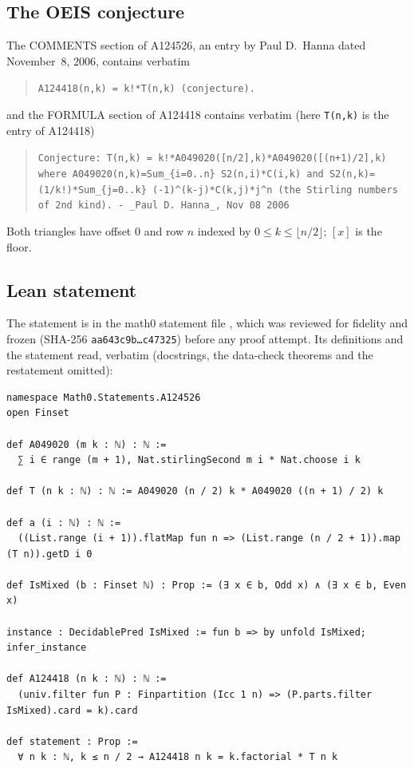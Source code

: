\documentclass[11pt]{amsart}
\theoremstyle{plain}
\theoremstyle{definition}
\begin{document}
\subsection*{The OEIS conjecture}
The COMMENTS section of A124526, an entry by Paul D.~Hanna dated November~8, 2006, contains verbatim
\begin{quote}
\small\texttt{A124418(n,k) = k!*T(n,k) (conjecture).}
\end{quote}
and the FORMULA section of A124418 contains verbatim (here \texttt{T(n,k)} is the entry of A124418)
\begin{quote}
\raggedright\small\texttt{Conjecture: T(n,k) = k!*A049020([n/2],k)*A049020([(n+1)/2],k) where A049020(n,k)=Sum\_\{i=0..n\} S2(n,i)*C(i,k) and S2(n,k)=(1/k!)*Sum\_\{j=0..k\} (-1)\^{}(k-j)*C(k,j)*j\^{}n (the Stirling numbers of 2nd kind). - \_Paul D.\ Hanna\_, Nov 08 2006}
\end{quote}
Both triangles have offset $0$ and row $n$ indexed by $0\le k\le\lfloor n/2\rfloor$; $[x]$ is the floor.

\subsection*{Lean statement}
The statement is  in the math0 statement file , which was reviewed for fidelity and frozen (SHA-256 \texttt{aa643c9b\ldots c47325}) before any proof attempt.
Its definitions and the statement read, verbatim (docstrings, the data-check theorems and the restatement  omitted):
\begin{lstlisting}
namespace Math0.Statements.A124526
open Finset

def A049020 (m k : ℕ) : ℕ :=
  ∑ i ∈ range (m + 1), Nat.stirlingSecond m i * Nat.choose i k

def T (n k : ℕ) : ℕ := A049020 (n / 2) k * A049020 ((n + 1) / 2) k

def a (i : ℕ) : ℕ :=
  ((List.range (i + 1)).flatMap fun n => (List.range (n / 2 + 1)).map (T n)).getD i 0

def IsMixed (b : Finset ℕ) : Prop := (∃ x ∈ b, Odd x) ∧ (∃ x ∈ b, Even x)

instance : DecidablePred IsMixed := fun b => by unfold IsMixed; infer_instance

def A124418 (n k : ℕ) : ℕ :=
  (univ.filter fun P : Finpartition (Icc 1 n) => (P.parts.filter IsMixed).card = k).card

def statement : Prop :=
  ∀ n k : ℕ, k ≤ n / 2 → A124418 n k = k.factorial * T n k
\end{lstlisting}
\end{document}
